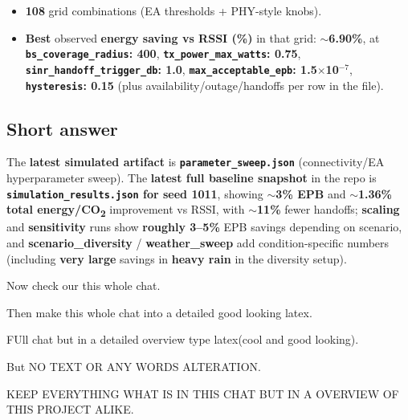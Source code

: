 \documentclass[11pt,a4paper]{article}
\begin{document}
\begin{assistmsg}
\begin{itemize}
\item \textbf{108} grid combinations (EA thresholds + PHY-style knobs).
\item \textbf{Best} observed \textbf{energy saving vs RSSI (\%)} in that grid: \textbf{$\sim$6.90\%}, at \textbf{\texttt{bs\_coverage\_radius}: 400}, \textbf{\texttt{tx\_power\_max\_watts}: 0.75}, \textbf{\texttt{sinr\_handoff\_trigger\_db}: 1.0}, \textbf{\texttt{max\_acceptable\_epb}: 1.5$\times$10$^{-7}$}, \textbf{\texttt{hysteresis}: 0.15} (plus availability/outage/handoffs per row in the file).
\end{itemize}

\subsection*{Short answer}

The \textbf{latest simulated artifact} is \textbf{\texttt{parameter\_sweep.json}} (connectivity/EA hyperparameter sweep). The \textbf{latest full baseline snapshot} in the repo is \textbf{\texttt{simulation\_results.json} for seed 1011}, showing \textbf{$\sim$3\% EPB} and \textbf{$\sim$1.36\% total energy/CO\textsubscript{2}} improvement vs RSSI, with \textbf{$\sim$11\%} fewer handoffs; \textbf{scaling} and \textbf{sensitivity} runs show \textbf{roughly 3--5\%} EPB savings depending on scenario, and \textbf{scenario\_diversity} / \textbf{weather\_sweep} add condition-specific numbers (including \textbf{very large} savings in \textbf{heavy rain} in the diversity setup).
\end{assistmsg}

\begin{usermsg}
Now check our this whole chat.

Then make this whole chat into a detailed good looking latex.

FUll chat but in a detailed overview type latex(cool and good looking).

But NO TEXT OR ANY WORDS ALTERATION.

KEEP EVERYTHING WHAT IS IN THIS CHAT BUT IN A OVERVIEW OF THIS PROJECT ALIKE.
\end{usermsg}
\end{document}
